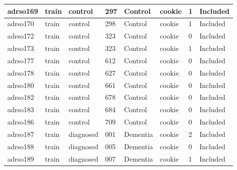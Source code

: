 \begin{center}
\begin{longtable}{|l|l|l|l|l|l|l|l|}
adrso169       & train                 & control           & 297                & Control              & cookie          & 1                & Included      \\ \hline
adrso170       & train                 & control           & 298                & Control              & cookie          & 1                & Included      \\ \hline
adrso172       & train                 & control           & 323                & Control              & cookie          & 0                & Included      \\ \hline
adrso173       & train                 & control           & 323                & Control              & cookie          & 1                & Included      \\ \hline
adrso177       & train                 & control           & 612                & Control              & cookie          & 0                & Included      \\ \hline
adrso178       & train                 & control           & 627                & Control              & cookie          & 0                & Included      \\ \hline
adrso180       & train                 & control           & 661                & Control              & cookie          & 0                & Included      \\ \hline
adrso182       & train                 & control           & 678                & Control              & cookie          & 0                & Included      \\ \hline
adrso183       & train                 & control           & 684                & Control              & cookie          & 0                & Included      \\ \hline
adrso186       & train                 & control           & 709                & Control              & cookie          & 0                & Included      \\ \hline
adrso187       & train                 & diagnosed         & 001                & Dementia             & cookie          & 2                & Included      \\ \hline
adrso188       & train                 & diagnosed         & 005                & Dementia             & cookie          & 0                & Included      \\ \hline
adrso189       & train                 & diagnosed         & 007                & Dementia             & cookie          & 1                & Included      \\ \hline

\end{longtable}
\end{center}
